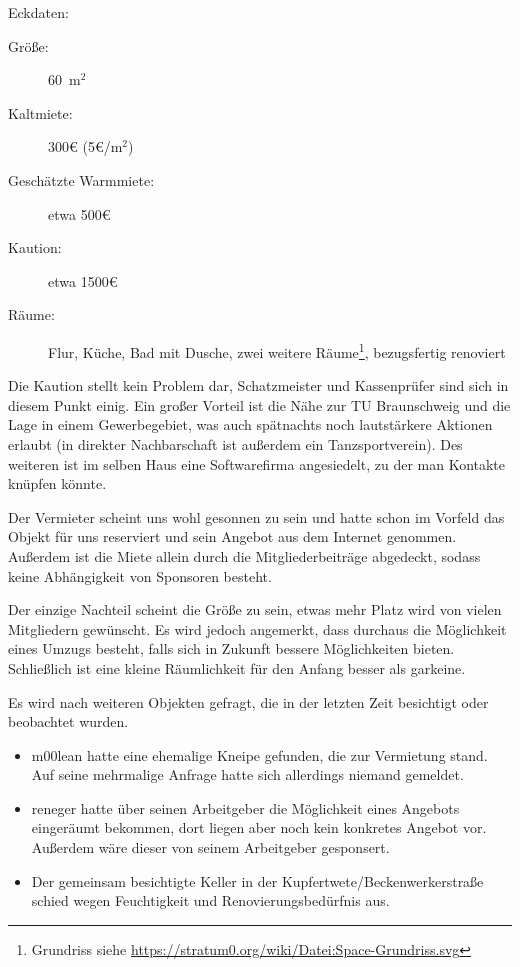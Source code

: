 \documentclass[a4paper,12pt]{scrartcl}
\begin{document}
Eckdaten:
\begin{description}
  \item[Größe:] 60~m$^2$
  \item[Kaltmiete:] 300€ (5€/m$^2$)
  \item[Geschätzte Warmmiete:] etwa 500€
  \item[Kaution:] etwa 1500€
  \item[Räume:] Flur, Küche, Bad mit Dusche, zwei weitere Räume\footnote{%
    Grundriss siehe \url{https://stratum0.org/wiki/Datei:Space-Grundriss.svg}},
    bezugsfertig renoviert
\end{description}

Die Kaution stellt kein Problem dar, Schatzmeister und Kassenprüfer sind sich in
diesem Punkt einig. Ein großer Vorteil ist die Nähe zur TU Braunschweig und die
Lage in einem Gewerbegebiet, was auch spätnachts noch lautstärkere Aktionen
erlaubt (in direkter Nachbarschaft ist außerdem ein Tanzsportverein). Des
weiteren ist im selben Haus eine Softwarefirma angesiedelt, zu der man Kontakte
knüpfen könnte.

Der Vermieter scheint uns wohl gesonnen zu sein und hatte schon im Vorfeld das
Objekt für uns reserviert und sein Angebot aus dem Internet genommen. Außerdem
ist die Miete allein durch die Mitgliederbeiträge abgedeckt, sodass keine
Abhängigkeit von Sponsoren besteht.

Der einzige Nachteil scheint die Größe zu sein, etwas mehr Platz wird von vielen
Mitgliedern gewünscht. Es wird jedoch angemerkt, dass durchaus die Möglichkeit
eines Umzugs besteht, falls sich in Zukunft bessere Möglichkeiten bieten.
Schließlich ist eine kleine Räumlichkeit für den Anfang besser als garkeine.

Es wird nach weiteren Objekten gefragt, die in der letzten Zeit besichtigt oder
beobachtet wurden.
\begin{itemize}
  \item m00lean hatte eine ehemalige Kneipe gefunden, die zur Vermietung stand.
    Auf seine mehrmalige Anfrage hatte sich allerdings niemand gemeldet.
  \item reneger hatte über seinen Arbeitgeber die Möglichkeit eines Angebots
    eingeräumt bekommen, dort liegen aber noch kein konkretes Angebot vor.
    Außerdem wäre dieser von seinem Arbeitgeber gesponsert.
  \item Der gemeinsam besichtigte Keller in der Kupfertwete/Beckenwerkerstraße
    schied wegen Feuchtigkeit und Renovierungsbedürfnis aus.
\end{itemize}
\end{document}
